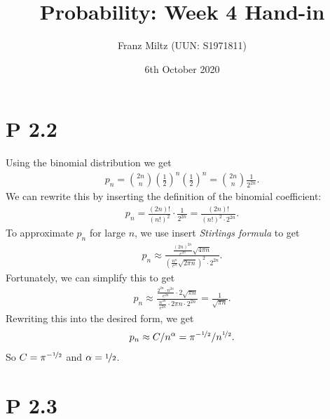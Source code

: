 \documentclass{article}
\begin{document}
\title{Probability: Week 4 Hand-in}
\author{Franz Miltz (UUN: S1971811)}
\date{6th October 2020}
\maketitle


\section*{P 2.2}


Using the binomial distribution we get
\begin{align*}
	p_n = \binom{2n}{n}\left(\frac{1}{2}\right)^n\left(\frac{1}{2}\right)^n
	=\binom{2n}{n}\frac{1}{2^{2n}}.
\end{align*}
We can rewrite this by inserting the definition of the binomial
coefficient:
\begin{align*}
	p_n = \frac{(2n)!}{(n!)^2}\cdot\frac{1}{2^{2n}}=\frac{(2n)!}{(n!)^2\cdot 2^{2n}}.
\end{align*}
To approximate $p_n$ for large $n$, we use insert \emph{Stirlings formula}
to get
\begin{align*}
	p_n \approx \frac{
		\frac{(2n)^{2n}}{e^{2n}}\sqrt{4\pi n}
	}{
		\left(\frac{n^n}{e^n}\sqrt{2\pi n}\right)^2\cdot 2^{2n}}.
\end{align*}
Fortunately, we can simplify this to get
\begin{align*}
	p_n\approx \frac{
		\frac{2^{2n}\cdot n^{2n}}{e^{2n}}\cdot2\sqrt{\pi n}
	}{
		\frac{n^{2n}}{e^{2n}}\cdot 2\pi n\cdot 2^{2n}}=\frac{1}{\sqrt{\pi n}}.
\end{align*}
Rewriting this into the desired form, we get
\begin{align*}
	p_n\approx C / n^\alpha = \pi^{-\nicefrac{1}{2}}/n^{\nicefrac{1}{2}}.
\end{align*}
So $C=\pi^{-\nicefrac{1}{2}}$ and $\alpha=\nicefrac{1}{2}$.


\section*{P 2.3}
\end{document}
